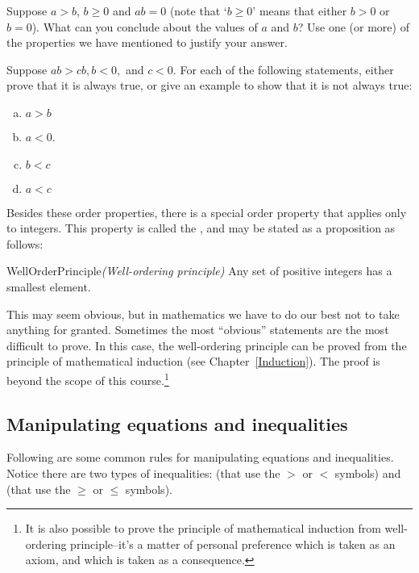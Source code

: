 \begin{exercise}{3}
Suppose $a > b$,  $b \ge 0$ and $ab = 0$ (note that `$b \ge 0$' means that either $b>0$ or $b=0$).  What can you conclude about the values of $a$ and $b$? Use one (or more)  of the properties we have mentioned to justify your answer.
\end{exercise}

\begin{exercise}{}
Suppose $ab>cb, b < 0,$ and $c<0$.  For each of the following statements, either prove that it is always true, or give an example to show that
it is not always true:
\begin{enumerate}[(a)]
\item
$a > b$ \qquad 
\item
$a < 0$.
\item
$b < c$ \qquad 
\item
$a < c$ \qquad 
\end{enumerate}
\end{exercise}

Besides these order properties, there is a special order property that applies only to integers. This property is called the , and may be stated as a proposition as follows:

\begin{prop}{WellOrderPrinciple}\emph{(Well-ordering principle)}
Any set of positive integers  has a smallest element.
\end{prop}

\noindent
This may seem obvious, but in mathematics we have to do our best not to take anything for granted.  Sometimes the most ``obvious'' statements are the most difficult to prove. In this case, the well-ordering principle can be proved from the principle of mathematical induction (see Chapter~\ref{Induction}). The proof is beyond the scope of this course.\footnote{It is also possible to prove the principle of mathematical induction from well-ordering principle--it's a matter of personal preference which is taken as an axiom, and which is taken as a consequence.}


\subsection {Manipulating equations and inequalities}
\label{subsec:Preliminaries:EqsAndIneqs}

Following are some common rules for manipulating equations and inequalities. Notice there are two types of inequalities:   (that use the $>$ or $<$ symbols) and  (that use the $\ge$ or $\le$ symbols). 

